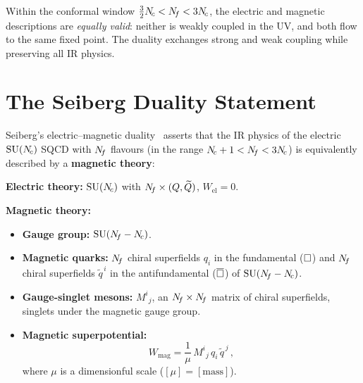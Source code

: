 \documentclass[11pt,a4paper]{article}
\begin{document}
\begin{remark}
  Within the conformal window $\tfrac{3}{2}N_{\!c} < N_{\!f} < 3N_{\!c}$, the electric
  and magnetic descriptions are \emph{equally valid}: neither is weakly coupled
  in the UV, and both flow to the same fixed point.  The duality exchanges
  strong and weak coupling while preserving all IR physics.
\end{remark}


\section{The Seiberg Duality Statement}
\label{sec:duality-statement}

Seiberg's electric--magnetic duality~\cite{Seiberg1995} asserts that the
IR physics of the electric $\mathrm{SU}(N_{\!c})$ SQCD with $N_{\!f}$ flavours (in the range
$N_{\!c} + 1 < N_{\!f} < 3N_{\!c}$) is equivalently described by a \textbf{magnetic
theory}:

\begin{tcolorbox}[
  enhanced,
  colback=blue!5!white,
  colframe=blue!70!black,
  fonttitle=\bfseries\large,
  title={Seiberg Duality for $\mathcal{N}=1$ SQCD},
  breakable
]
\textbf{Electric theory:} $\mathrm{SU}(N_{\!c})$ with $N_{\!f} \times (Q, \widetilde{Q})$,
\quad $W_{\text{el}} = 0$.

\textbf{Magnetic theory:}
\begin{itemize}
  \item \textbf{Gauge group:} $\mathrm{SU}(N_{\!f} - N_{\!c})$.
  \item \textbf{Magnetic quarks:} $N_{\!f}$ chiral superfields $q_i$ in the
    fundamental ($\square$) and $N_{\!f}$ chiral superfields $\widetilde{q}^{\,i}$
    in the antifundamental ($\overline{\square}$) of $\mathrm{SU}(N_{\!f} - N_{\!c})$.
  \item \textbf{Gauge-singlet mesons:} $M^i{}_j$, an $N_{\!f} \times N_{\!f}$ matrix
    of chiral superfields, singlets under the magnetic gauge group.
  \item \textbf{Magnetic superpotential:}
    \begin{equation}\label{eq:W-mag}
      W_{\text{mag}} = \frac{1}{\mu}\, M^i{}_j\, q_i\, \widetilde{q}^{\,j}\,,
    \end{equation}
    where $\mu$ is a dimensionful scale ($[\mu] = [\text{mass}]$).
\end{itemize}
\end{tcolorbox}
\end{document}
